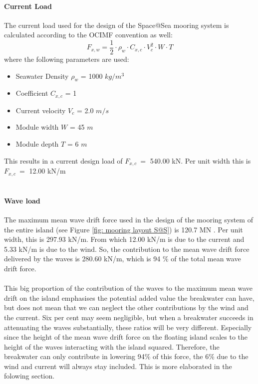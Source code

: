 \paragraph{Current Load}
The current load used for the design of the Space@Sea mooring system is calculated according to the \acrshort{OCIMF} convention as well:
\begin{equation}
    F_{x,w} = \frac{1}{2} \cdot \rho_w \cdot C_{x,c} \cdot V_c^2 \cdot W \cdot T
\end{equation}
where the following parameters are used:
\begin{itemize}
    \item Seawater Density $\rho_w$ = 1000 $kg/m^3$
    \item Coefficient $C_{x,c}$ = 1
    \item Current velocity $V_c$ = 2.0 $m/s$
    \item Module width $W$ = 45 $m$
    \item Module depth $T$ = 6 $m$
\end{itemize}
This results in a current design load of $F_{x,c}~ = $ 540.00 kN. Per unit width this is $F_{x,c}~ = $ 12.00 kN/m\\
\\
\paragraph{Wave load}
The maximum mean wave drift force used in the design of the mooring system of the entire island (see Figure \ref{fig: mooring layout S@S}) is 120.7 MN \cite{D3.3space@sea}. Per unit width, this is 297.93 kN/m. From which 12.00 kN/m is due to the current and 5.33 kN/m is due to the wind. So, the contribution to the mean wave drift force delivered by the waves is 280.60 kN/m, which is 94 \% of the total mean wave drift force.\\
\\
This big proportion of the contribution of the waves to the maximum mean wave drift on the island emphasises the potential added value the breakwater can have, but does not mean that we can neglect the other contributions by the wind and the current. Six per cent may seem negligible, but when a breakwater succeeds in attenuating the waves substantially, these ratios will be very different. Especially since the height of the mean wave drift force on the floating island scales to the height of the waves interacting with the island squared. Therefore, the breakwater can only contribute in lowering 94\% of this force, the 6\% due to the wind and current will always stay included. This is more elaborated in the folowing section. 


